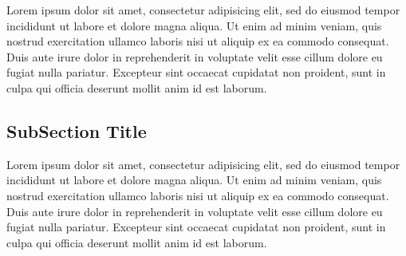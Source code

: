         Lorem ipsum dolor sit amet, consectetur adipisicing elit, sed do eiusmod tempor incididunt ut labore et dolore magna aliqua. Ut enim ad minim veniam, quis nostrud exercitation ullamco laboris nisi ut aliquip ex ea commodo consequat. Duis aute irure dolor in reprehenderit in voluptate velit esse cillum dolore eu fugiat nulla pariatur. Excepteur sint occaecat cupidatat non proident, sunt in culpa qui officia deserunt mollit anim id est laborum.

        \subsection{SubSection Title}
        Lorem ipsum dolor sit amet, consectetur adipisicing elit, sed do eiusmod tempor incididunt ut labore et dolore magna aliqua. Ut enim ad minim veniam, quis nostrud exercitation ullamco laboris nisi ut aliquip ex ea commodo consequat. Duis aute irure dolor in reprehenderit in voluptate velit esse cillum dolore eu fugiat nulla pariatur. Excepteur sint occaecat cupidatat non proident, sunt in culpa qui officia deserunt mollit anim id est laborum.
